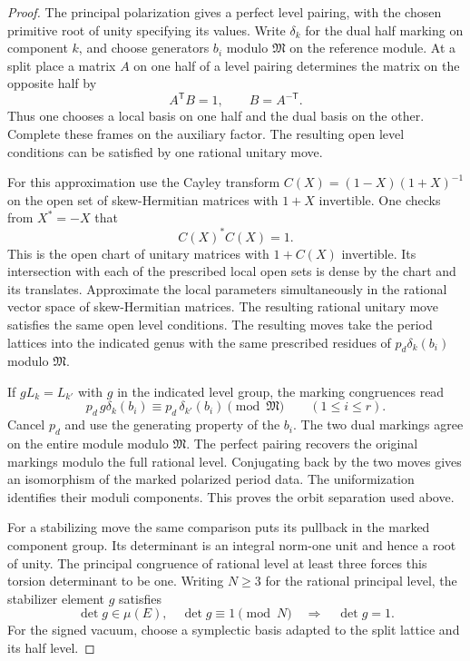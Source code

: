 \begin{proof}
The principal polarization gives a perfect level pairing, with
the chosen primitive root of unity specifying its values. Write \(\delta_k\) for the dual half marking on component
\(k\), and choose generators \(b_i\) modulo \(\mathfrak M\)
on the reference module. At a split place a matrix \(A\)
on one half of a level pairing determines the matrix on the
opposite half by
\[
                  A^{\mathsf T}B=1,\qquad B=A^{-\mathsf T}.
\]
Thus one chooses a local basis on one half and the dual basis
on the other. Complete these frames on the auxiliary factor.
The resulting open level conditions can be satisfied by one
rational unitary move.

For this approximation use the Cayley transform
\(C(X)=(1-X)(1+X)^{-1}\) on the open set of skew-Hermitian
matrices with \(1+X\) invertible. One checks from \(X^*=-X\)
that 
\[
  C(X)^*C(X)=1.
\]
 This is the open chart of unitary
matrices with \(1+C(X)\) invertible. Its intersection with
each of the prescribed local open sets is dense by the chart
and its translates. Approximate the local parameters
simultaneously in the rational vector space of skew-Hermitian
matrices. The resulting rational unitary move satisfies the
same open level conditions.
The resulting moves take the period lattices into the indicated
genus with the same prescribed residues of \(p_d\delta_k(b_i)\)
modulo \(\mathfrak M\).

If \(gL_k=L_{k'}\) with \(g\) in the indicated level
group, the marking congruences read
\[
        p_d\,g\delta_k(b_i)
                \equiv p_d\,\delta_{k'}(b_i)\pmod{\mathfrak M}
                       \qquad(1\le i\le r).
\]
Cancel \(p_d\) and use the generating property of the \(b_i\).
The two dual markings agree on the entire module modulo
\(\mathfrak M\). The perfect pairing recovers the original
markings modulo the full rational level. Conjugating back by
the two moves gives an isomorphism of the marked polarized
period data. The uniformization identifies their moduli components.
This proves the orbit separation used above.

For a stabilizing move the same comparison puts its pullback in
the marked component group. Its determinant is an integral
norm-one unit and hence a root of unity. The principal congruence
of rational level at least three forces this torsion determinant
to be one.
Writing \(N\ge3\) for the rational principal level, the stabilizer element \(g\) satisfies
\[
  \det g\in\mu(E),\quad \det g\equiv1\pmod{N}\quad\Longrightarrow\quad\det g=1 .
\]
 For the signed vacuum, choose a symplectic basis
adapted to the split lattice and its half level.


\end{proof}
